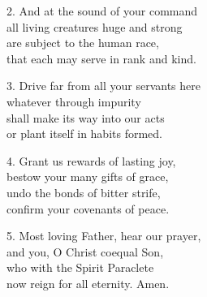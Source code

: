 
2. And at the sound of your command\\
all living creatures huge and strong\\
are subject to the human race,\\
that each may serve in rank and kind.

3. Drive far from all your servants here\\
whatever through impurity\\
shall make its way into our acts\\
or plant itself in habits formed.

4. Grant us rewards of lasting joy,\\
bestow your many gifts of grace,\\
undo the bonds of bitter strife,\\
confirm your covenants of peace.

5. Most loving Father, hear our prayer,\\
and you, O Christ coequal Son,\\
who with the Spirit Paraclete\\
now reign for all eternity. Amen.